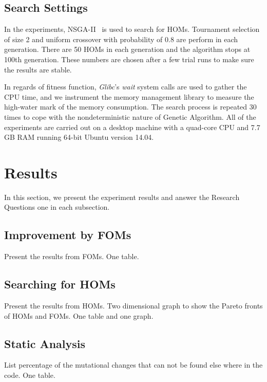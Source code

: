 \documentclass[oribibl]{llncs}
\begin{document}
\subsection{Search Settings}
\label{sec_searchsetting}

In the experiments, NSGA-II~\cite{996017} is used to search for HOMs.
Tournament selection of size 2 and uniform crossover with probability of 0.8 are perform in each generation.
There are 50 HOMs in each generation and the algorithm stops at 100th generation.
These numbers are chosen after a few trial runs to make sure the results are stable.

In regards of fitness function, \emph{Glibc}'s \emph{wait} system calls are used to gather the CPU time, and we instrument the memory management library to measure the high-water mark of the memory consumption.
The search process is repeated 30 times to cope with the nondeterministic nature of Genetic Algorithm.
All of the experiments are carried out on a desktop machine with a quad-core CPU and 7.7 GB RAM running 64-bit Ubuntu version 14.04.

\section{Results}
\label{sec_result}

In this section, we present the experiment results and answer the Research Questions one in each subsection.

\subsection{Improvement by FOMs}
\label{sec_resfom}

Present the results from FOMs. One table.

\subsection{Searching for HOMs}
\label{sec_reshom}

Present the results from HOMs. Two dimensional graph to show the Pareto fronts of HOMs and FOMs. One table and one graph.

\subsection{Static Analysis}
\label{sec_resstatic}

List percentage of the mutational changes that can not be found else where in the code. One table.
\end{document}
